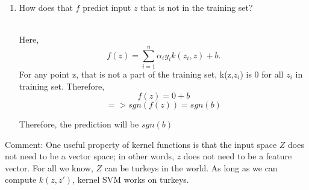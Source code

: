 \documentclass[a4paper]{article}
\theoremstyle{definition}
\newenvironment{soln}{
    \leavevmode\color{blue}\ignorespaces
}{}
\begin{document}
\begin{enumerate}
\begin{soln}
\end{soln}


\item How does that $f$ predict input $z$ that is not in the training set?
\begin{soln}
\\Here,
$$f(z) = \sum_{i=1}^n \alpha_i y_i k(z_i, z) + b.$$
For any point z, that is not a part of the training set,  k(z,$z_i$) is 0 for all $z_i$ in training set. Therefore, 
$$ f(z) = 0 +b$$
$$ => sgn(f(z)) = sgn(b) $$

Therefore, the prediction will be $sgn(b)$
\end{soln}

\end{enumerate}

Comment: One useful property of kernel functions is that the input space $Z$ does not need to be a vector space; in other words, $z$ does not need to be a feature vector.  For all we know, $Z$ can be turkeys in the world.  As long as we can compute $k(z,z')$, kernel SVM works on turkeys.
\end{document}
